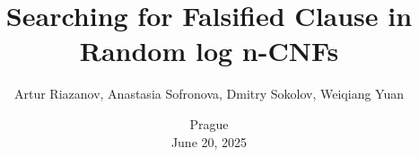 

\titlegraphic{
    
}


\title[]{
    Searching for Falsified Clause in Random log n-CNFs
}

\author{
    Artur Riazanov,
    Anastasia Sofronova,
    Dmitry Sokolov,
    Weiqiang Yuan
}  


\date{
    Prague\\
    June 20, 2025
}






    \maketitle
    
    
    
    
    
    

